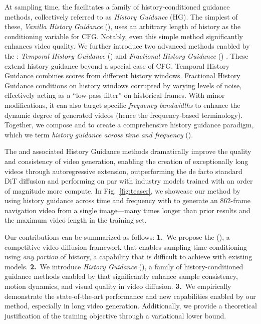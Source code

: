 At sampling time, the \mtd facilitates a family of history-conditioned guidance methods, collectively referred to as \emph{History Guidance} (HG). The simplest of these, \emph{Vanilla History Guidance} (\HGv), uses an arbitrary length of history as the conditioning variable for CFG. Notably, even this simple method significantly enhances video quality. We further introduce two advanced methods enabled by the \mtd: \emph{Temporal History Guidance} (\HGt) and \emph{Fractional History Guidance} (\HGf)
. These extend history guidance beyond a special case of CFG. Temporal History Guidance combines scores from different history windows. Fractional History Guidance conditions on history windows corrupted by varying levels of noise, effectively acting as a ``low-pass filter'' on historical frames. With minor modifications, it can also target specific \emph{frequency bandwidths} to enhance the dynamic degree of generated videos (hence the frequency-based terminology). Together, we compose \HGt and \HGf to create a comprehensive history guidance paradigm, which we term \emph{history guidance across time and frequency} (\HGtf).



The \method and associated History Guidance methods dramatically improve the quality and consistency of video generation, enabling the creation of exceptionally long videos through autoregressive extension, outperforming the de facto standard DiT diffusion and performing on par with industry models trained with an order of magnitude more compute. In Fig.~\ref{fig:teaser}, we showcase our method by using history guidance across time and frequency with \mtd{} to generate an 862-frame navigation video from a single image—many times longer than prior results and the maximum video length in the training set.


Our contributions can be summarized as follows: 
\textbf{1.}~We propose the \emph{\method} (\mtd), a competitive video diffusion framework that enables sampling-time conditioning using \emph{any portion} of history, a capability that is difficult to achieve with existing models.
\textbf{2.}~We introduce \emph{History Guidance} (\HG), a family of history-conditioned guidance methods enabled by \mtd that significantly enhance sample consistency, motion dynamics, and visual quality in video diffusion.
\textbf{3.}~We empirically demonstrate the state-of-the-art performance and new capabilities enabled by our method, especially in long video generation. Additionally, we provide a theoretical justification of the training objective through a variational lower bound.

